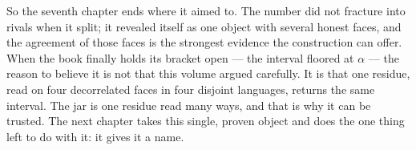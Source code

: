 So the seventh chapter ends where it aimed to. The number did not fracture into rivals when it split; it revealed
itself as one object with several honest faces, and the agreement of those faces is the strongest evidence the
construction can offer. When the book finally holds its bracket open --- the interval floored at $\alpha$ --- the
reason to believe it is not that this volume argued carefully. It is that one residue, read on four decorrelated faces
in four disjoint languages, returns the same interval. The jar is one residue read many ways, and that is why it can be
trusted. The next chapter takes this single, proven object and does the one thing left to do with it: it gives it a
name.
